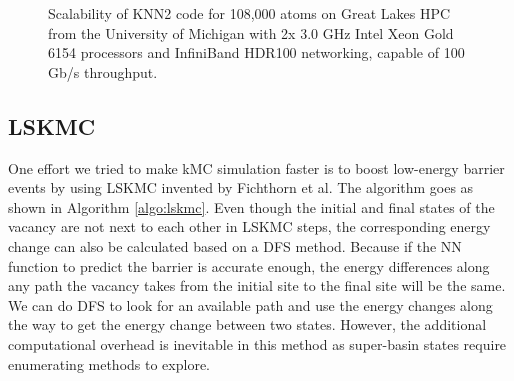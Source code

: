 \begingroup
\begin{figure}[!ht]
  \centering
\caption[Scalability of KNN2 code for 108,000 atoms on Great Lakes HPC from the University of Michigan with 2x 3.0 GHz Intel Xeon Gold 6154 processors and InfiniBand HDR100 networking, capable of 100 Gb/s throughput.]{Scalability of KNN2 code for 108,000 atoms on Great Lakes HPC from the University of Michigan with 2x 3.0 GHz Intel Xeon Gold 6154 processors and InfiniBand HDR100 networking, capable of 100 Gb/s throughput.}
\label{Chap:Al/Vac:fig:scale}
\end{figure}
\endgroup


\subsection{\acf{LSKMC}}
\label{Chap:Al/Vac:sec:LSKMC}
One effort we tried to make \ac{kMC} simulation faster is to boost low-energy barrier events by using \acf{LSKMC} invented by Fichthorn et al\cite{fichthorn2013local}. The algorithm goes as shown in Algorithm \ref{algo:lskmc}. Even though the initial and final states of the vacancy are not next to each other in \ac{LSKMC} steps, the corresponding energy change can also be calculated based on a \ac{DFS} method. Because if the \ac{NN} function to predict the barrier is accurate enough, the energy differences along any path the vacancy takes from the initial site to the final site will be the same. We can do \ac{DFS} to look for an available path and use the energy changes along the way to get the energy change between two states. However, the additional computational overhead is inevitable in this method as super-basin states require enumerating methods to explore.

